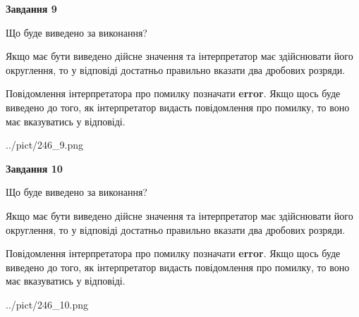 \documentclass[12pt, ukrainian]{article}
\begin{document}
{\begin {Large}
{\begin {center}\textbf{Завдання 9}\end {center}}\par
Що буде виведено за виконання? \par

Якщо має бути виведено дійсне значення та інтерпретатор має здійснювати його округлення, 
то у відповіді достатньо правильно вказати два дробових розряди.

Повідомлення інтерпретатора про помилку позначати \textbf{error}.
Якщо щось буде виведено до того, як інтерпретатор видасть повідомлення про помилку, 
то воно має вказуватись у відповіді. \par

\begin{center}
	{../pict/246_9.png}
\end{center}
\newpage

{\begin {center}\textbf{Завдання 10}\end {center}}\par
Що буде виведено за виконання? \par

Якщо має бути виведено дійсне значення та інтерпретатор має здійснювати його округлення, 
то у відповіді достатньо правильно вказати два дробових розряди.

Повідомлення інтерпретатора про помилку позначати \textbf{error}.
Якщо щось буде виведено до того, як інтерпретатор видасть повідомлення про помилку, 
то воно має вказуватись у відповіді. \par

\begin{center}
	{../pict/246_10.png}
\end{center}
\newpage

\end {Large}}
\end{document}
